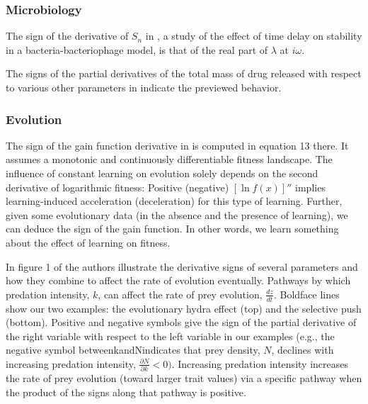 \documentclass[11pt]{book}
\begin{document}

\subsubsection{Microbiology}

The sign of the derivative of $S_{n}$ in \cite{beretta2003effect}, a study of the effect of time delay on stability in
a bacteria-bacteriophage model,
is that of the real part of $\lambda$ at $i\omega$.

The signs of the partial derivatives of the total mass of drug released
with respect to various other parameters in \cite{bernardes2019fighting}
indicate the previewed behavior.


\subsubsection{Evolution}

The sign of the gain function derivative in \cite{paenke2009influence}
is computed in equation 13 there. It assumes a monotonic and continuously
differentiable fitness landscape. The influence of constant learning
on evolution solely depends on the second derivative of logarithmic
fitness: Positive (negative) $\left[\ln f\left(x\right)\right]''$
implies learning-induced acceleration (deceleration) for this type
of learning. Further, given some evolutionary data (in the absence
and the presence of learning), we can deduce the sign of the gain
function. In other words, we learn something about the effect of learning
on fitness.

In figure 1 of \cite{osmond2017predators} the authors illustrate
the derivative signs of several parameters and how they combine to
affect the rate of evolution eventually. Pathways by which predation
intensity, $k$, can affect the rate of prey evolution, $\frac{dz}{dt}$.
Boldface lines show our two examples: the evolutionary hydra effect
(top) and the selective push (bottom). Positive and negative symbols
give the sign of the partial derivative of the right variable with
respect to the left variable in our examples (e.g., the negative symbol
betweenkandNindicates that prey density, $N$, declines with increasing
predation intensity, $\frac{\partial N}{\partial k}<0)$. Increasing
predation intensity increases the rate of prey evolution (toward larger
trait values) via a specific pathway when the product of the signs
along that pathway is positive.
\end{document}
